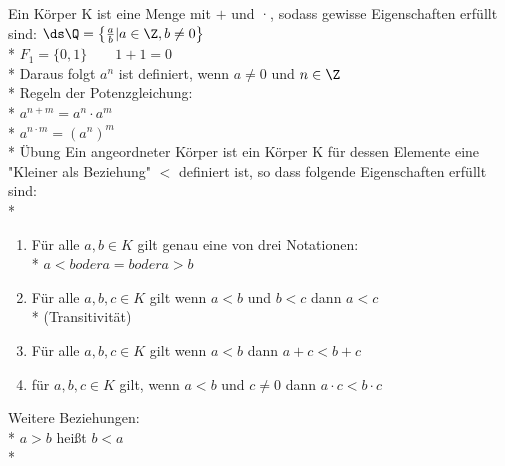 %
\wdh
Ein Körper K ist eine Menge mit $+$ und ·, sodass gewisse Eigenschaften erfüllt sind:
\bsp
$\ds\Q = \left\{\frac{a}{b} | a \in \Z, b \neq 0\right\}$\\*
$F_1 = \{0, 1\} \qquad 1 + 1 = 0$\\*
Daraus folgt $a^n$ ist definiert, wenn $a \neq 0$ und $n \in \Z$\\*
Regeln der Potenzgleichung:\\*
$a^{n+m} = a^n \cdot a^m$\\*
$a^{n \cdot m} = (a^{n})^m$\\*
\bew
Übung
%
    Ein angeordneter Körper ist ein Körper K für dessen Elemente eine "Kleiner als Beziehung" $<$ definiert ist, so dass folgende Eigenschaften erfüllt sind:\\*
    \begin{enumerate}
    \item{Für alle $a, b \in K$ gilt genau eine von drei Notationen:\\*
    $a < b oder a = b oder a > b$}
    \item{Für alle $a, b, c \in K$ gilt wenn $a < b$ und $b < c$ dann $a < c$\\* (Transitivität)}
    \item{Für alle $a, b, c \in K$ gilt wenn $a < b$ dann $a + c < b + c$}
    \item{für $a, b, c \in K$ gilt, wenn $a < b$ und $c \neq 0$ dann $a \cdot c < b \cdot c$}
    \end{enumerate}
	Weitere Beziehungen:\\*
	$a > b$ heißt $b < a$\\*
